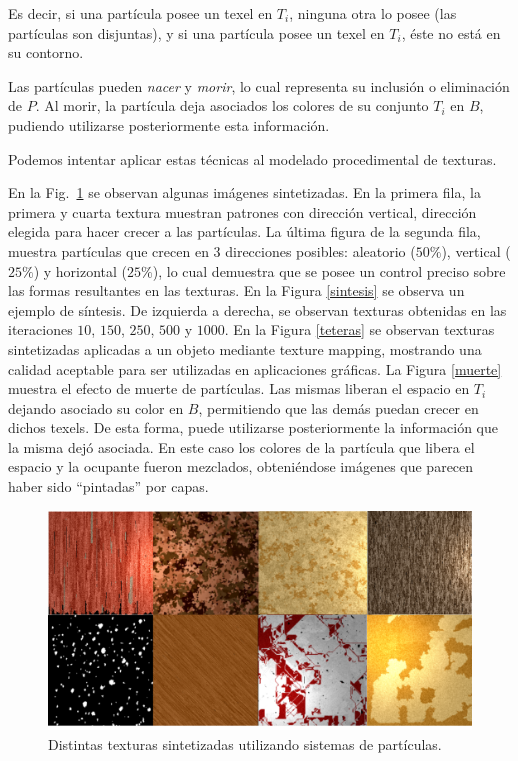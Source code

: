 Es decir, si una part\'icula posee un texel en $T_{i}$, ninguna otra lo posee (las part\'iculas son disjuntas), y si una part\'icula posee un texel en $T_{i}$, \'este no est\'a en su contorno.

Las part\'iculas pueden {\em nacer} y {\em morir}, lo cual representa su inclusi\'on o eliminaci\'on de $P$.
Al morir, la part\'icula deja asociados los colores de su conjunto $T_{i}$ en $B$, pudiendo utilizarse posteriormente esta informaci\'on.

Podemos intentar aplicar estas técnicas al modelado procedimental de texturas. 

En la Fig.~\ref{resultados} se observan algunas im\'agenes sintetizadas.
En la primera fila, la primera y cuarta textura muestran patrones con direcci\'on vertical, direcci\'on elegida para hacer crecer a las part\'iculas.
La \'ultima figura de la segunda fila, muestra part\'iculas que crecen en 3 direcciones posibles: aleatorio ($50\%$), vertical ($25\%$) y horizontal ($25\%$), lo cual demuestra que se posee un control preciso sobre las formas resultantes en las texturas.
En la Figura \ref{sintesis} se observa un ejemplo de s\'intesis.
De izquierda a derecha, se observan texturas obtenidas en las iteraciones $10$, $150$, $250$, $500$ y $1000$.
En la Figura \ref{teteras} se observan texturas sintetizadas aplicadas a un objeto mediante texture mapping, mostrando una calidad aceptable para ser utilizadas en aplicaciones gr\'aficas.
La Figura \ref{muerte} muestra el efecto de muerte de part\'iculas.
Las mismas liberan el espacio en $T_{i}$ dejando asociado su color en $B$, permitiendo que las dem\'as puedan crecer en dichos texels.
De esta forma, puede utilizarse posteriormente la informaci\'on que la misma dej\'o asociada.
En este caso los colores de la part\'icula que libera el espacio y la ocupante fueron mezclados, obteni\'endose im\'agenes que parecen haber sido ``pintadas'' por capas.


\begin{figure}[t!]
\centering
\includegraphics[scale=0.18]{resultados}
\caption{Distintas texturas sintetizadas utilizando sistemas de partículas.}
\label{resultados}
\end{figure}

